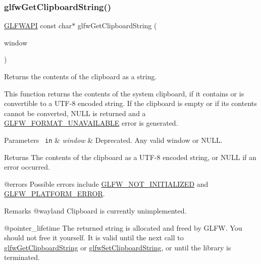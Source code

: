 \subsubsection{\texorpdfstring{glfwGetClipboardString()}{glfwGetClipboardString()}}
{\footnotesize\ttfamily \mbox{\hyperlink{glfw3_8h_a56da5036b2cc259351ae22fd6439bb47}{G\+L\+F\+W\+A\+PI}} const char$\ast$ glfw\+Get\+Clipboard\+String (\begin{DoxyParamCaption}\item[{\mbox{\hyperlink{group__window_ga3c96d80d363e67d13a41b5d1821f3242}{G\+L\+F\+Wwindow}} $\ast$}]{window }\end{DoxyParamCaption})}



Returns the contents of the clipboard as a string. 

This function returns the contents of the system clipboard, if it contains or is convertible to a U\+T\+F-\/8 encoded string. If the clipboard is empty or if its contents cannot be converted, {\ttfamily N\+U\+LL} is returned and a \mbox{\hyperlink{group__errors_ga196e125ef261d94184e2b55c05762f14}{G\+L\+F\+W\+\_\+\+F\+O\+R\+M\+A\+T\+\_\+\+U\+N\+A\+V\+A\+I\+L\+A\+B\+LE}} error is generated.


\begin{DoxyParams}[1]{Parameters}
\mbox{\texttt{ in}}  & {\em window} & Deprecated. Any valid window or {\ttfamily N\+U\+LL}. \\
\hline
\end{DoxyParams}
\begin{DoxyReturn}{Returns}
The contents of the clipboard as a U\+T\+F-\/8 encoded string, or {\ttfamily N\+U\+LL} if an error occurred.
\end{DoxyReturn}
@errors Possible errors include \mbox{\hyperlink{group__errors_ga2374ee02c177f12e1fa76ff3ed15e14a}{G\+L\+F\+W\+\_\+\+N\+O\+T\+\_\+\+I\+N\+I\+T\+I\+A\+L\+I\+Z\+ED}} and \mbox{\hyperlink{group__errors_gad44162d78100ea5e87cdd38426b8c7a1}{G\+L\+F\+W\+\_\+\+P\+L\+A\+T\+F\+O\+R\+M\+\_\+\+E\+R\+R\+OR}}.

\begin{DoxyRemark}{Remarks}
@wayland Clipboard is currently unimplemented.
\end{DoxyRemark}
@pointer\+\_\+lifetime The returned string is allocated and freed by G\+L\+FW. You should not free it yourself. It is valid until the next call to \mbox{\hyperlink{group__input_ga3ac90c8bbaf0b46063bb02b574f3b6f7}{glfw\+Get\+Clipboard\+String}} or \mbox{\hyperlink{group__input_ga7a580309bbc185a0459c3559021d2fd7}{glfw\+Set\+Clipboard\+String}}, or until the library is terminated.

